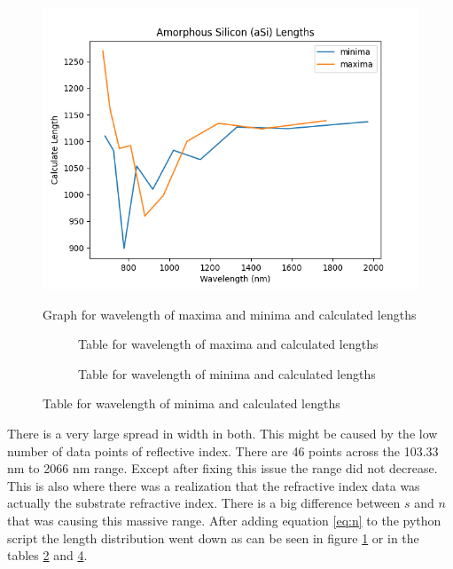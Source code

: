 \documentclass[10pt,a4paper]{article}
\begin{document}
\begin{multicols}{2}
\begin{figure}[H]\centering\label{AmSiLengthGraph}
\includegraphics[scale=0.5]{asilength}
\caption{Graph for wavelength of maxima and minima and calculated lengths}
\end{figure}

\begin{figure}[H]\centering
\begin{subfigure}[b]{0.3\textwidth}\centering\label{AmSiLengthTable max}
\caption{Table for wavelength of maxima and calculated lengths}
\end{subfigure}
\begin{subfigure}[b]{0.3\textwidth}\centering\label{AmSiLengthTablemin}
\caption{Table for wavelength of minima and calculated lengths}
\end{subfigure}
\end{figure}
There is a very large spread in width in both. This might be caused by the low number of data points of reflective index. There are 46 points across the 103.33 nm to 2066 nm range. Except after fixing this issue the range did not decrease. This is also where there was a realization that the refractive index data was actually the substrate refractive index. There is a big difference between $s$ and $n$ that was causing this massive range. After adding equation \ref{eq:n} to the python script the length distribution went down as can be seen in figure \ref{AmSiLengthGraph} or in the tables \ref{AmSiLengthTable max} and \ref{AmSiLengthTablemin}.\\



\end{multicols}
\end{document}
